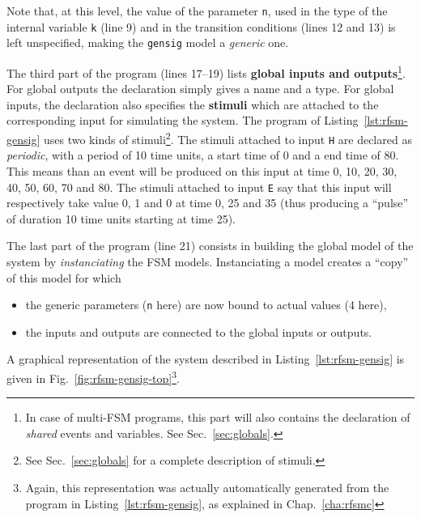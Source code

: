 Note that, at this level, the value of the parameter \verb|n|, used in the type of the internal variable
\verb|k| (line 9) and in the transition conditions (lines 12 and 13) is left unspecified, making the
\verb|gensig| model a \emph{generic} one.

\medskip The third part of the program (lines 17--19) lists \textbf{global inputs and
  outputs}\footnote{In case of multi-FSM programs, this part will also contains the declaration of
  \emph{shared} events and variables. See Sec.~\ref{sec:globals}.}.  For global outputs the
declaration simply gives a name and a type.  For global inputs, the declaration also specifies the
\textbf{stimuli} which are attached to the corresponding input for simulating the system. The
program of Listing~\ref{lst:rfsm-gensig} uses two kinds of stimuli\footnote{See
  Sec.~\ref{sec:globals} for a complete description of stimuli.}. The stimuli attached to input
\verb|H| are declared as \emph{periodic}, with a period of 10 time units, a start time of 0 and a
end time of 80. This means than an event will be produced on this input at time 0, 10, 20, 30, 40,
50, 60, 70 and 80. The stimuli attached to input \verb|E| say that this input will respectively take
value 0, 1 and 0 at time 0, 25 and 35 (thus producing a ``pulse'' of duration 10 time units starting
at time 25).

\medskip
The last part of the program (line 21) consists in building the global model of the system by
\emph{instanciating} the FSM models.
Instanciating a model creates a ``copy'' of this model for which
\begin{itemize}
\item the generic parameters (\verb|n| here) are now bound to actual values (4 here),
\item the inputs and outputs are connected to the global inputs or outputs. 
\end{itemize}

\medskip
A graphical representation of the system described in Listing~\ref{lst:rfsm-gensig} is given in
Fig.~\ref{fig:rfsm-gensig-top}\footnote{Again, this representation was actually automatically generated from the
program in Listing~\ref{lst:rfsm-gensig}, as explained in Chap.~\ref{cha:rfsmc}}. 

